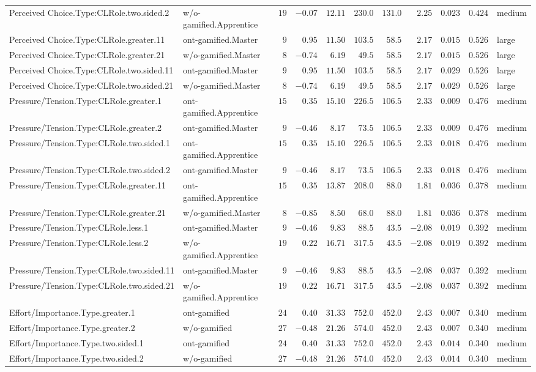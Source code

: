 \documentclass[6pt,a4paper]{article}
\begin{document}
\begin{landscape}
{\begin{longtable}{llrrrrrrrrl}
Perceived Choice.Type:CLRole.two.sided.2&w/o-gamified.Apprentice&$19$&$-0.07$&$12.11$&$230.0$&$131.0$&$ 2.25$&$0.023$&$0.424$&medium\tabularnewline
Perceived Choice.Type:CLRole.greater.11&ont-gamified.Master&$ 9$&$ 0.95$&$11.50$&$103.5$&$ 58.5$&$ 2.17$&$0.015$&$0.526$&large\tabularnewline
Perceived Choice.Type:CLRole.greater.21&w/o-gamified.Master&$ 8$&$-0.74$&$ 6.19$&$ 49.5$&$ 58.5$&$ 2.17$&$0.015$&$0.526$&large\tabularnewline
Perceived Choice.Type:CLRole.two.sided.11&ont-gamified.Master&$ 9$&$ 0.95$&$11.50$&$103.5$&$ 58.5$&$ 2.17$&$0.029$&$0.526$&large\tabularnewline
Perceived Choice.Type:CLRole.two.sided.21&w/o-gamified.Master&$ 8$&$-0.74$&$ 6.19$&$ 49.5$&$ 58.5$&$ 2.17$&$0.029$&$0.526$&large\tabularnewline
Pressure/Tension.Type:CLRole.greater.1&ont-gamified.Apprentice&$15$&$ 0.35$&$15.10$&$226.5$&$106.5$&$ 2.33$&$0.009$&$0.476$&medium\tabularnewline
Pressure/Tension.Type:CLRole.greater.2&ont-gamified.Master&$ 9$&$-0.46$&$ 8.17$&$ 73.5$&$106.5$&$ 2.33$&$0.009$&$0.476$&medium\tabularnewline
Pressure/Tension.Type:CLRole.two.sided.1&ont-gamified.Apprentice&$15$&$ 0.35$&$15.10$&$226.5$&$106.5$&$ 2.33$&$0.018$&$0.476$&medium\tabularnewline
Pressure/Tension.Type:CLRole.two.sided.2&ont-gamified.Master&$ 9$&$-0.46$&$ 8.17$&$ 73.5$&$106.5$&$ 2.33$&$0.018$&$0.476$&medium\tabularnewline
Pressure/Tension.Type:CLRole.greater.11&ont-gamified.Apprentice&$15$&$ 0.35$&$13.87$&$208.0$&$ 88.0$&$ 1.81$&$0.036$&$0.378$&medium\tabularnewline
Pressure/Tension.Type:CLRole.greater.21&w/o-gamified.Master&$ 8$&$-0.85$&$ 8.50$&$ 68.0$&$ 88.0$&$ 1.81$&$0.036$&$0.378$&medium\tabularnewline
Pressure/Tension.Type:CLRole.less.1&ont-gamified.Master&$ 9$&$-0.46$&$ 9.83$&$ 88.5$&$ 43.5$&$-2.08$&$0.019$&$0.392$&medium\tabularnewline
Pressure/Tension.Type:CLRole.less.2&w/o-gamified.Apprentice&$19$&$ 0.22$&$16.71$&$317.5$&$ 43.5$&$-2.08$&$0.019$&$0.392$&medium\tabularnewline
Pressure/Tension.Type:CLRole.two.sided.11&ont-gamified.Master&$ 9$&$-0.46$&$ 9.83$&$ 88.5$&$ 43.5$&$-2.08$&$0.037$&$0.392$&medium\tabularnewline
Pressure/Tension.Type:CLRole.two.sided.21&w/o-gamified.Apprentice&$19$&$ 0.22$&$16.71$&$317.5$&$ 43.5$&$-2.08$&$0.037$&$0.392$&medium\tabularnewline
Effort/Importance.Type.greater.1&ont-gamified&$24$&$ 0.40$&$31.33$&$752.0$&$452.0$&$ 2.43$&$0.007$&$0.340$&medium\tabularnewline
Effort/Importance.Type.greater.2&w/o-gamified&$27$&$-0.48$&$21.26$&$574.0$&$452.0$&$ 2.43$&$0.007$&$0.340$&medium\tabularnewline
Effort/Importance.Type.two.sided.1&ont-gamified&$24$&$ 0.40$&$31.33$&$752.0$&$452.0$&$ 2.43$&$0.014$&$0.340$&medium\tabularnewline
Effort/Importance.Type.two.sided.2&w/o-gamified&$27$&$-0.48$&$21.26$&$574.0$&$452.0$&$ 2.43$&$0.014$&$0.340$&medium\tabularnewline

\end{longtable}}
\end{landscape}
\end{document}
